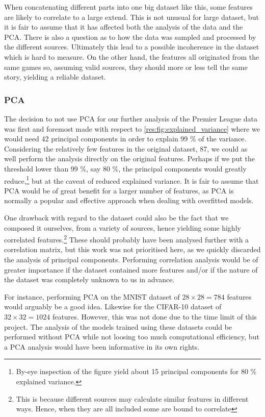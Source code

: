         When concatenating different parts into one big dataset like this, some features are likely to correlate to a large extend. This is not unusual for large dataset, but it is fair to assume that it has affected both the analysis of the data and the PCA. There is also a question as to how the data was sampled and processed by the different sources. Ultimately this lead to a possible incoherence in the dataset which is hard to measure. On the other hand, the features all originated from the same games so, assuming valid sources, they should more or less tell the same story, yielding a reliable dataset. 
    
\subsubsection{PCA}
    The decision to not use PCA for our further analysis of the Premier League data was first and foremost made with respect to \cref{res:fig:explained_variance} where we would need 42 principal components in order to explain 99 \% of the variance. Considering the relatively few features in the original dataset, 87, we could as well perform the analysis directly on the original features. Perhaps if we put the threshold lower than 99 \%, say 80 \%, the principal components would greatly reduce,\footnote{By-eye inspection of the  figure yield about 15 principal components for 80 \% explained variance.} but at the caveat of reduced explained variance. It is fair to assume that PCA would be of great benefit for a larger number of features, as PCA is normally a popular and effective approach when dealing with overfitted models.

    One drawback with regard to the dataset could also be the fact that we composed it ourselves, from a variety of sources, hence yielding some highly correlated features.\footnote{This is because different sources may calculate similar features in different ways. Hence, when they are all included some are bound to correlate} These should probably have been analysed further with a correlation matrix, but this work was not prioritised here, as we quickly discarded the analysis of principal components. Performing correlation analysis would be of greater importance if the dataset contained more features and/or if the nature of the dataset was completely unknown to us in advance. 

    For instance, performing PCA on the MNIST dataset of $28\times 28 = 784$ features would arguably be a good idea. Likewise for the CIFAR-10 dataset of $32\times 32 = 1024$ features. However, this was not done due to the time limit of this project. The analysis of the models trained using these datasets could be performed without PCA while not loosing too much computational efficiency, but a PCA analysis would have been informative in its own rights. 





